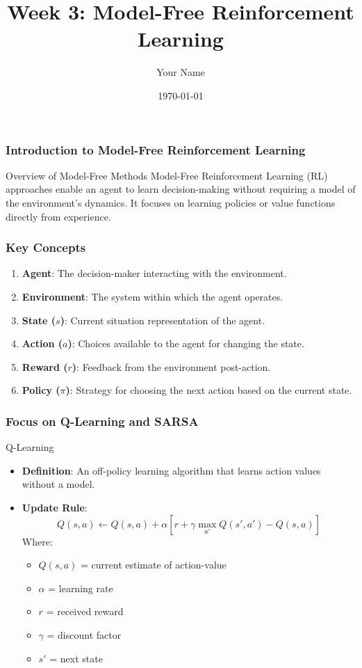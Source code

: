 \documentclass{beamer}
\title{Week 3: Model-Free Reinforcement Learning}
\author{Your Name}
\institute{Your Institution}
\date{\today}
\begin{document}
\frame{\titlepage}

\begin{frame}[fragile]
    \frametitle{Introduction to Model-Free Reinforcement Learning}
    \begin{block}{Overview of Model-Free Methods}
        Model-Free Reinforcement Learning (RL) approaches enable an agent to learn decision-making without requiring a model of the environment's dynamics. It focuses on learning policies or value functions directly from experience.
    \end{block}
\end{frame}

\begin{frame}[fragile]
    \frametitle{Key Concepts}
    \begin{enumerate}
        \item \textbf{Agent}: The decision-maker interacting with the environment.
        \item \textbf{Environment}: The system within which the agent operates.
        \item \textbf{State ($s$)}: Current situation representation of the agent.
        \item \textbf{Action ($a$)}: Choices available to the agent for changing the state.
        \item \textbf{Reward ($r$)}: Feedback from the environment post-action.
        \item \textbf{Policy ($\pi$)}: Strategy for choosing the next action based on the current state.
    \end{enumerate}
\end{frame}

\begin{frame}[fragile]
    \frametitle{Focus on Q-Learning and SARSA}
    \begin{block}{Q-Learning}
        \begin{itemize}
            \item \textbf{Definition}: An off-policy learning algorithm that learns action values without a model.
            \item \textbf{Update Rule}:
            \begin{equation}
            Q(s, a) \leftarrow Q(s, a) + \alpha \left[ r + \gamma \max_{a'} Q(s', a') - Q(s, a) \right]
            \end{equation}
            Where:
            \begin{itemize}
                \item $Q(s, a)$ = current estimate of action-value
                \item $\alpha$ = learning rate
                \item $r$ = received reward
                \item $\gamma$ = discount factor
                \item $s'$ = next state
            \end{itemize}
        \end{itemize}
    \end{block}
\end{frame}
\end{document}
